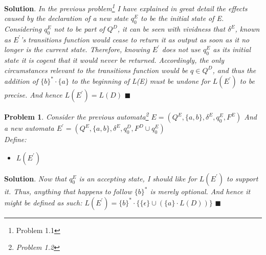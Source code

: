 \documentclass[12pt]{article}
\renewcommand{\=}[1]{\stackrel{#1}{=}} %
\newtheorem{p}{Problem}[section]
\theoremstyle{definition}
\newenvironment{s}{%
        \begin{trivlist} \item \textbf{Solution}. }{%
            \hspace*{\fill} $\blacksquare$\end{trivlist}}%
\begin{document}
\begin{s} \newline
  \emph{In the previous problem\footnote{Problem 1.1} I have explained in great detail the effects caused by the declaration of a new state $q_0^{E}$ to be the initial state of E. Considering $q_0^{E}$ not to be part of $Q^{D}$, it can be seen with vividness that $\delta^{E}$, known as $E^{\prime}$'s transitions function would cease to return it as output as soon as it no longer is the current state. Therefore, knowing $E^{\prime}$ does not use $q_0^{E}$ as its initial state it is cogent that it would never be returned. Accordingly, the only circumstances relevant to the transitions function would be $q \in Q^{D}$, and thus the addition of $\{b\}^{*} \cdot \{a\}$ to the beginning of L(E) must be undone for $L(E^{\prime})$ to be precise. And hence $L(E^{\prime}) = L(D)$}
\end{s}
\begin{p}
  \emph{\newline Consider the previous automata\footnote{Problem 1.2} $E = (Q^{E}, \{a,b\}, \delta^{E}, q_0^{E}, F^{E})$} \newline
  \emph{And a new automata $E^{\prime} = (Q^{E}, \{a,b\}, \delta^{E}, q_0^{D}, F^{D} \cup q_0^{E})$} \newline
  \\
  Define: 
  \begin{itemize}
    \item $L(E^{\prime})$
  \end{itemize}
\end{p}
\begin{s} \newline
  \emph{Now that $q_0^{E}$ is an accepting state, I should like for $L(E^{\prime})$ to support it. Thus, anything that happens to follow $\{b\}^{*}$ is merely optional. And hence it might be defined as such: $L(E^{\prime}) = \{b\}^{*} \cdot \{\{\epsilon\} \cup (\{a\} \cdot L(D))\}$} 
\end{s}
\end{document}
